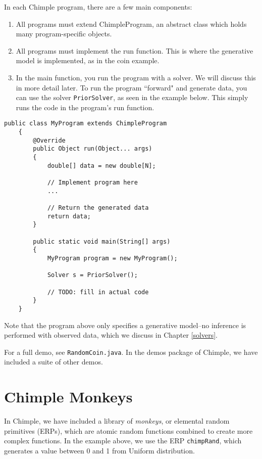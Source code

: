 In each Chimple program, there are a few main components:
\begin{enumerate}
    \item All programs must extend ChimpleProgram, an abstract class which
    holds many program-specific objects.
    \item All programs must implement the run function. This is where the generative model is
    implemented, as in the coin example.
    \item In the main function, you run the program with a solver.
        We will discuss this in more detail later.
        To run the program ``forward" and generate data, you can use the solver
        \texttt{PriorSolver}, as seen in the example below.
        This simply runs the code in the program's run function.
\end{enumerate}
%
\begin{center}
\begin{lstlisting}[style=customc]
    public class MyProgram extends ChimpleProgram
    {
        @Override
        public Object run(Object... args)
        {
            double[] data = new double[N];

            // Implement program here
            ...

            // Return the generated data
            return data;
        }

        public static void main(String[] args)
        {
            MyProgram program = new MyProgram();

            Solver s = PriorSolver();

            // TODO: fill in actual code
        }
    }
\end{lstlisting}
\end{center}
%
Note that the program above only specifies a generative model--no inference
    is performed with observed data, which we discuss in Chapter \ref{solvers}.

For a full demo, see \texttt{RandomCoin.java}. In the demos package of Chimple,
    we have included a suite of other demos.


\section{Chimple Monkeys}

In Chimple, we have included a library of \emph{monkeys}, or elemental random
primitives (ERPs), which are atomic random functions combined to create more complex functions.
In the example above, we use the ERP \texttt{chimpRand}, which generates a
value between 0 and 1 from Uniform distribution.

